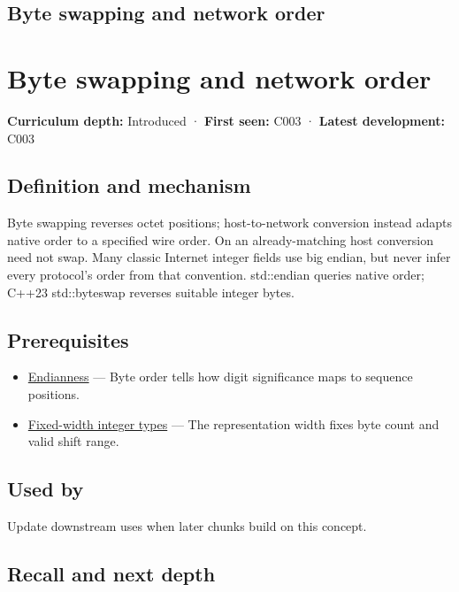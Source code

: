 \hypertarget{appendix-11ba36693aa2}{}
\section*{Byte swapping and network order}
\chapter{Byte swapping and network order}\label{appendix-11ba36693aa2-byte-swapping-and-network-order}

\textbf{Curriculum depth:} Introduced · \textbf{First seen:} C003 · \textbf{Latest development:} C003

\section{Definition and mechanism}\label{appendix-11ba36693aa2-definition-and-mechanism}

Byte swapping reverses octet positions; host-to-network conversion instead adapts native order to a specified wire order. On an already-matching host conversion need not swap. Many classic Internet integer fields use big endian, but never infer every protocol's order from that convention. std::endian queries native order; C++23 std::byteswap reverses suitable integer bytes.

\section{Prerequisites}\label{appendix-11ba36693aa2-prerequisites}

\begin{itemize}
\tightlist
\item
  \hyperref[appendix-bc07c3d25b18]{Endianness} --- Byte order tells how digit significance maps to sequence positions.
\item
  \hyperref[appendix-cc04044b5782]{Fixed-width integer types} --- The representation width fixes byte count and valid shift range.
\end{itemize}

\section{Used by}\label{appendix-11ba36693aa2-used-by}

Update downstream uses when later chunks build on this concept.

\section{Recall and next depth}\label{appendix-11ba36693aa2-recall-and-next-depth}

